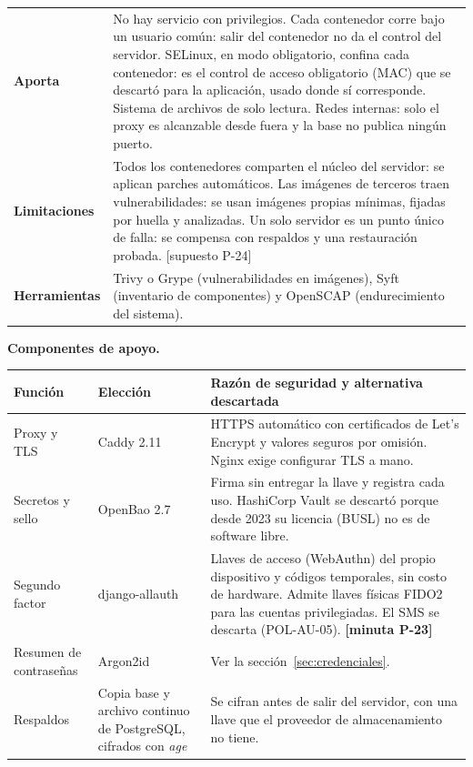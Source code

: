 \documentclass[11pt,letterpaper]{article}
\newcommand{\cab}[1]{\textbf{\rmfamily #1}}
\newcommand{\resp}[1]{\textrm{\footnotesize\bfseries [minuta #1]}}
\newcommand{\supu}[1]{\textrm{\footnotesize [supuesto #1]}}
\newcommand{\fila}[1]{\textrm{\bfseries #1}}
\begin{document}
{\begin{longtable}{@{}L{2.4cm} L{13.5cm}@{}}
\fila{Aporta} & No hay servicio con privilegios. Cada contenedor corre bajo un usuario común: salir del contenedor no da el control del servidor. SELinux, en modo obligatorio, confina cada contenedor: es el control de acceso obligatorio (MAC) que se descartó para la aplicación, usado donde sí corresponde. Sistema de archivos de solo lectura. Redes internas: solo el proxy es alcanzable desde fuera y la base no publica ningún puerto. \\
\fila{Limitaciones} & Todos los contenedores comparten el núcleo del servidor: se aplican parches automáticos. Las imágenes de terceros traen vulnerabilidades: se usan imágenes propias mínimas, fijadas por huella y analizadas. Un solo servidor es un punto único de falla: se compensa con respaldos y una restauración probada. \supu{P-24} \\
\fila{Herramientas} & Trivy o Grype (vulnerabilidades en imágenes), Syft (inventario de componentes) y OpenSCAP (endurecimiento del sistema). \\
\bottomrule
\end{longtable}
}

\textbf{Componentes de apoyo.}

\begin{center}
\small
\renewcommand{\arraystretch}{1.13}
\begin{tabularx}{\textwidth}{@{}L{2.5cm} L{3.4cm} Y@{}}
\toprule
\cab{Función} & \cab{Elección} & \cab{Razón de seguridad y alternativa descartada} \\
\midrule
Proxy y TLS & Caddy 2.11 & HTTPS automático con certificados de Let's Encrypt y valores seguros por omisión. Nginx exige configurar TLS a mano. \\
Secretos y sello & OpenBao 2.7 & Firma sin entregar la llave y registra cada uso. HashiCorp Vault se descartó porque desde 2023 su licencia (BUSL) no es de software libre. \\
Segundo factor & django-allauth & Llaves de acceso (WebAuthn) del propio dispositivo y códigos temporales, sin costo de hardware. Admite llaves físicas FIDO2 para las cuentas privilegiadas. El SMS se descarta (POL-AU-05). \resp{P-23} \\
Resumen de contraseñas & Argon2id & Ver la sección~\ref{sec:credenciales}. \\
Respaldos & Copia base y archivo continuo de PostgreSQL, cifrados con \emph{age} & Se cifran antes de salir del servidor, con una llave que el proveedor de almacenamiento no tiene. \\
\bottomrule
\end{tabularx}
\end{center}
\end{document}
